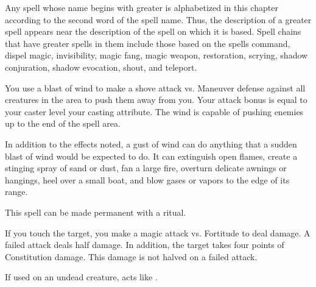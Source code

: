 \par Any spell whose name begins with greater is alphabetized in this chapter according to the second word of the spell name. Thus, the description of a greater spell appears near the description of the spell on which it is based. Spell chains that have greater spells in them include those based on the spells command, dispel magic, invisibility, magic fang, magic weapon, restoration, scrying, shadow conjuration, shadow evocation, shout, and teleport.

\begin{spelleffect}
    You use a blast of wind to make a shove attack vs. Maneuver defense against all creatures in the area to push them away from you. Your attack bonus is equal to your caster level \add your casting attribute. The wind is capable of pushing enemies up to the end of the spell area. 
  \par In addition to the effects noted, a gust of wind can do anything that a sudden blast of wind would be expected to do. It can extinguish open flames, create a stinging spray of sand or dust, fan a large fire, overturn delicate awnings or hangings, heel over a small boat, and blow gases or vapors to the edge of its range.
\end{spelleffect}
\begin{spellnotes}
    This spell can be made permanent with a  ritual.
\end{spellnotes}

\begin{comment}
\subsubsection{H}
\end{comment}

\spellrng{\rngtouch}
\begin{spelleffect}
    If you touch the target, you make a magic attack vs. Fortitude to deal damage. A failed attack deals half damage. In addition, the target takes four points of Constitution damage. This damage is not halved on a failed attack.
\end{spelleffect}
\begin{spellnotes}
    If used on an undead creature,  acts like .
\end{spellnotes}

